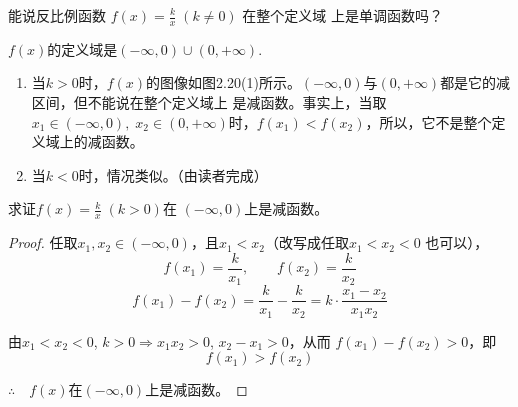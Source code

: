 \begin{example}
    能说反比例函数
$f(x)=\frac{k}{x}\; (k\ne 0)$
在整个定义域
上是单调函数吗？
\end{example}

\begin{figure}[htp]
    \centering
{}
    \caption{}
\end{figure}

\begin{analyze}
$f(x)$的定义域是$(-\infty,0)\cup (0,+\infty)$.
\begin{enumerate}[(1)]
    \item 当$k>0$时，$f(x)$的图像如图2.20(1)所示。$(-\infty,0)$与$ (0,+\infty)$都是它的减区间，但不能说在整个定义域上
    是减函数。事实上，当取$x_1\in (-\infty,0),\; x_2\in (0,+\infty)$时，$f(x_1)<f(x_2)$，所以，它不是整个定义域上的减函数。
    \item 当$k<0$时，情况类似。（由读者完成）
\end{enumerate}
\end{analyze}

\begin{example}
    求证$f(x)=\frac{k}{x}\; (k>0)$在
$(-\infty,0)$上是减函数。
\end{example}

\begin{proof}
任取$x_1,x_2\in(-\infty,0)$，且$x_1<x_2$（改写成任取$x_1<x_2<0$
也可以），
\[f(x_1)=\frac{k}{x_1},\qquad f(x_2)=\frac{k}{x_2}\]
    \[f(x_1)-f(x_2)=\frac{k}{x_1}-\frac{k}{x_2}=k\cdot \frac{x_1-x_2}{x_1x_2}\]

    由$x_1<x_2<0$, $k>0\Longrightarrow x_1x_2>0$, 
$x_2-x_1>0$，从而
$f(x_1)-f(x_2)>0$，即
\[f(x_1)>f(x_2)\]

$\therefore\quad f(x)$在$(-\infty,0)$上是减函数。
\end{proof}

